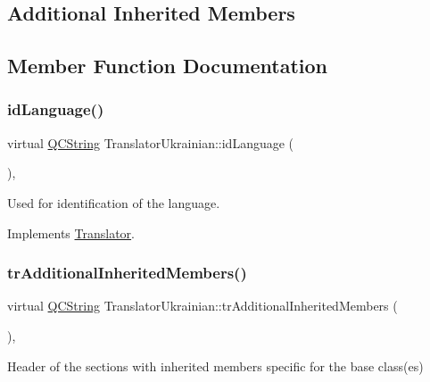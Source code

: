 \subsection*{Additional Inherited Members}


\subsection{Member Function Documentation}
\mbox{\label{class_translator_ukrainian_a21c77e76cdceb9b887e0fedda1b42fa5}} 
\subsubsection{\texorpdfstring{idLanguage()}{idLanguage()}}
{\footnotesize\ttfamily virtual \mbox{\hyperlink{class_q_c_string}{Q\+C\+String}} Translator\+Ukrainian\+::id\+Language (\begin{DoxyParamCaption}{ }\end{DoxyParamCaption})\hspace{0.3cm}{\ttfamily [inline]}, {\ttfamily [virtual]}}

Used for identification of the language. 

Implements \mbox{\hyperlink{class_translator}{Translator}}.

\mbox{\label{class_translator_ukrainian_afb64f5fb5e9a8fd3ac37982e7a6e2e84}} 
\subsubsection{\texorpdfstring{trAdditionalInheritedMembers()}{trAdditionalInheritedMembers()}}
{\footnotesize\ttfamily virtual \mbox{\hyperlink{class_q_c_string}{Q\+C\+String}} Translator\+Ukrainian\+::tr\+Additional\+Inherited\+Members (\begin{DoxyParamCaption}{ }\end{DoxyParamCaption})\hspace{0.3cm}{\ttfamily [inline]}, {\ttfamily [virtual]}}

Header of the sections with inherited members specific for the base class(es) 

